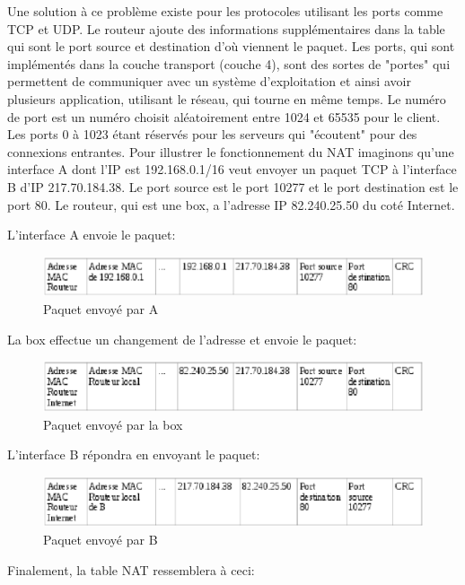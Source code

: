 Une solution à ce problème existe pour les protocoles utilisant les ports comme
TCP et UDP. Le routeur ajoute des informations supplémentaires dans la table
qui sont le port source et destination d'où viennent le paquet. Les ports, qui
sont implémentés dans la couche transport (couche 4), sont des sortes de
"portes" qui permettent de communiquer avec un système d'exploitation et ainsi
avoir plusieurs application, utilisant le réseau, qui tourne en même temps. Le
numéro de port est un numéro choisit aléatoirement entre 1024 et 65535 pour le
client. Les ports 0 à 1023 étant réservés pour les serveurs qui "écoutent" pour
des connexions entrantes.
\newline
Pour illustrer le fonctionnement du NAT imaginons qu'une interface A dont l'IP
est 192.168.0.1/16 veut envoyer un paquet TCP à l'interface B d'IP 217.70.184.38.
Le port source est le port 10277 et le port destination est le port 80. Le
routeur, qui est une box, a l'adresse IP  82.240.25.50 du coté Internet.

L'interface A envoie le paquet:
\begin{figure}[h]
\centering
\includegraphics[width=12cm]{./pics/PaquetAR.eps}
\caption{Paquet envoyé par A}
\label{fig:paquetAR}
\end{figure}

La box effectue un changement de l'adresse et envoie le paquet:
\begin{figure}[h]
\centering
\includegraphics[width=12cm]{./pics/PaquetRB.eps}
\caption{Paquet envoyé par la box}
\label{fig:paquetRB}
\end{figure}

\newpage

L'interface B répondra en envoyant le paquet:
\begin{figure}[h]
\centering
\includegraphics[width=12cm]{./pics/PaquetBR.eps}
\caption{Paquet envoyé par B}
\label{fig:paquetBR}
\end{figure}
\smallbreak
Finalement, la table NAT ressemblera à ceci:

